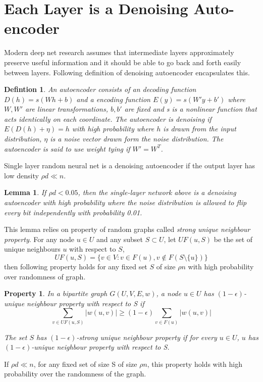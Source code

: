 \documentclass[11pt]{article}
\newtheorem{defn}{Defintion}
\newtheorem{lemma}{Lemma}
\newtheorem{prop}{Property}
\begin{document}
	\section{Each Layer is a Denoising Auto-encoder}
	Modern deep net research assumes that intermediate layers approximately preserve useful information and it should be able to go back and forth easily between layers. Following definition of denoising autoencoder encapsulates this.

	\begin{defn}
		An autoencoder consists of an decoding function $D(h) = s(Wh+b)$ and a encoding function $E(y) = s(W'y+b')$ where $W, W'$ are linear transformations, $b,b'$ are fixed and s is a nonlinear function that acts identically on each coordinate. The autoencoder is denoising if $E(D(h)+\eta) = h$ with high probability where $h$ is drawn from the input distribution, $\eta$ is a noise vector drawn form the noise distribution. The autoencoder is said to use weight tying if $W' = W^T$.   
	\end{defn}

	Single layer random neural net is a denoising autoencoder if the output layer has low density $\rho d \ll n$. 
	\begin{lemma}
		\label{cl:autoencoder}
		If $\rho d < 0.05$, then the single-layer network above is a denoising autoencoder with high probability where the noise distribution is allowed to flip every bit independently with probability 0.01. 
	\end{lemma}

	This lemma relies on property of random graphs called \emph{strong unique neighbour property}. For any node $u \in U$ and any subset $S\subset U$, let $UF(u,S)$ be the set of unique neighbours $u$ with respect to $S$, 
	\[ UF(u,S) = \{v \in V: v \in F(u),  v\notin F(S \setminus \{u\}) \}\]
	then following property holds for any fixed set $S$ of size $\rho n$ with high probability over randomness of graph.
	\begin{prop}
		In a bipartite graph $G(U,V,E,w)$, a node $u \in U$ has $(1-\epsilon)$-unique neighbour property with respect to S if 
		\[ \sum_{v \in UF(u,S)}|w(u,v)| \geq (1-\epsilon) \sum_{v \in F(u)}|w(u,v)|\]

		The set $S$ has $(1-\epsilon)$-strong unique neighbour property if for every $u \in U$, $u$ has $(1-\epsilon)$-unique neighbour property with respect to S.
	\end{prop}
	If $\rho d \ll n$, for any fixed set of size S of size $\rho n$, this property holds with high probability over the randomness of the graph.
\end{document}
